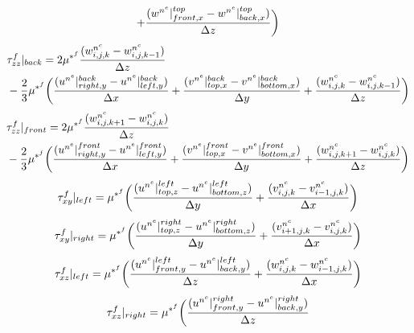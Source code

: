 \documentclass[fleqn]{article}
\begin{document}
{\begin{align*}
   +   \frac{ (w^{n^{e}}|^{top}_{front,x} - w^{n^{e}}|^{top}_{back,x}) }{ \delz }\biggl )
\end{align*}
%
\begin{align*}
&       \tau^{f}_{zz}|_{back} = 
    2   \mu^{*^{f}} \frac{ (\wvelnc_{i,j,k} - \wvelnc_{i,j,k-1}) }{ \delz }\\ 
&   -   \frac{2}{3}\mu^{*^{f}}\biggr(\frac{(u^{n^{e}}|^{back}_{right,y} - u^{n^{e}}|^{back}_{left,y}) }{ \delx }
    +   \frac{ (v^{n^{e}}|^{back}_{top,x}   - v^{n^{e}}|^{back}_{bottom,x}) }{ \dely } 
    +   \frac{ (\wvelnc_{i,j,k} - \wvelnc_{i,j,k-1}) }{ \delz }\biggl )
\end{align*}
%
%
%
%
\begin{align*}
&       \tau^{f}_{zz}|_{front} = 
    2   \mu^{*^{f}} \frac{ (\wvelnc_{i,j,k+1} - \wvelnc_{i,j,k}) }{ \delz }\\ 
&   -   \frac{2}{3}\mu^{*^{f}}\biggr(\frac{(u^{n^{e}}|^{front}_{right,y} - u^{n^{e}}|^{front}_{left,y}) }{ \delx }
    +   \frac{ (v^{n^{e}}|^{front}_{top,x}   - v^{n^{e}}|^{front}_{bottom,x}) }{ \dely }  
   +   \frac{ (\wvelnc_{i,j,k+1} - \wvelnc_{i,j,k}) }{ \delz }\biggl )
\end{align*}
%
\begin{equation*}
    \tau^{f}_{xy}|_{left} = 
    \mu^{*^{f}} \biggr(\frac{ (u^{n^{e}}|^{left}_{top,z} - u^{n^{e}}|^{left}_{bottom,z}) }{ \dely } 
+   \frac{ (\vvelnc_{i,j,k} - \vvelnc_{i-1,j,k}) }{ \delx } \biggl)
\end{equation*}
%
%
\begin{equation*}
    \tau^{f}_{xy}|_{right} = 
    \mu^{*^{f}} \biggr(\frac{ (u^{n^{e}}|^{right}_{top,z} - u^{n^{e}}|^{right}_{bottom,z}) }{ \dely } 
+   \frac{ (\vvelnc_{i+1,j,k} - \vvelnc_{i,j,k}) }{ \delx } \biggl)
\end{equation*}
%
%
\begin{equation*}
    \tau^{f}_{xz}|_{left} =
    \mu^{*^{f}} \biggr(\frac{ (u^{n^{e}}|^{left}_{front,y} - u^{n^{e}}|^{left}_{back,y}) }{ \delz } 
+   \frac{ (\wvelnc_{i,j,k} - \wvelnc_{i-1,j,k}) }{ \delx }\biggl )
\end{equation*}
%
%
\begin{equation*}
    \tau^{f}_{xz}|_{right} =
    \mu^{*^{f}} \biggr(\frac{ (u^{n^{e}}|^{right}_{front,y} - u^{n^{e}}|^{right}_{back,y}) }{ \delz }

\end{equation*}}
\end{document}

